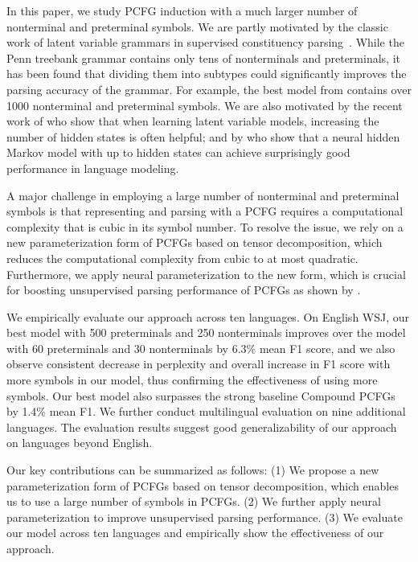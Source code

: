 \documentclass[11pt]{article}
\begin{document}
In this paper, we study PCFG induction with a much larger number of nonterminal and preterminal symbols.
We are partly motivated by the classic work of latent variable grammars in supervised constituency parsing~\citep{matsuzaki-etal-2005-probabilistic,petrov-etal-2006-learning,liang-etal-2007-infinite,cohen-etal-2012-spectral,zhao-etal-2018-gaussian}. While the Penn treebank grammar contains only tens of nonterminals and preterminals, it has been found that dividing them into subtypes could significantly improves the parsing accuracy of the grammar. For example, the best model from \citet{petrov-etal-2006-learning} contains over 1000 nonterminal and preterminal symbols.
We are also motivated by the recent work of \citet{buhai2019empirical} who show that when learning latent variable models, increasing the number of hidden states is often helpful; and by \citet{chiu-rush-2020-scaling} who show that a neural hidden Markov model with up to  hidden states can achieve surprisingly good performance in language modeling. 








A major challenge in employing a large number of nonterminal and preterminal symbols is that representing and parsing with a PCFG requires a computational complexity that is cubic in its symbol number.
To resolve the issue, we rely on a new parameterization form of PCFGs based on tensor decomposition, which reduces the computational complexity from cubic to at most quadratic.
Furthermore, we apply neural parameterization to the new form, which is crucial for boosting unsupervised parsing performance of PCFGs as shown by \citet{kim-etal-2019-compound}.


We empirically evaluate our approach across ten languages.
On English WSJ, 
our best model with 500 preterminals and 250 nonterminals 
improves over the model with 60 preterminals and 30 nonterminals by 6.3\% mean F1 score, and we also observe consistent decrease in perplexity and overall increase in F1 score with more symbols in our model,
thus confirming the effectiveness of using more symbols.
Our best model also surpasses the strong baseline Compound PCFGs~\citep{kim-etal-2019-compound} by 1.4\% mean F1.
We further conduct multilingual evaluation on nine additional languages.
The evaluation results suggest good generalizability of our approach on languages beyond English.

Our key contributions can be summarized as follows:
(1) We propose a new parameterization form of PCFGs based on tensor decomposition, which enables us to use a large number of symbols in PCFGs.
(2) We further apply neural parameterization to improve unsupervised parsing performance.
(3) We evaluate our model across ten languages and empirically show the effectiveness of our approach.
\end{document}

